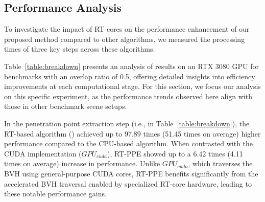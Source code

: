 
%


\subsection{Performance Analysis}

To investigate the impact of RT cores on the performance enhancement of our proposed method compared to other algorithms, we measured the processing times of three key steps across these algorithms. 

Table~\ref{table:breakdown} presents an analysis of results on an RTX 3080 GPU for benchmarks with an overlap ratio of 0.5, offering detailed insights into efficiency improvements at each computational stage.  
For this section, we focus our analysis on this specific experiment, as the performance trends observed here align with those in other benchmark scene setups.


In the penetration point extraction step (i.e.,  in Table~\ref{table:breakdown}), the RT-based algorithm () achieved up to 97.89 times (51.45 times on average) higher performance compared to the CPU-based algorithm.
When contrasted with the CUDA implementation ($GPU_{cuda}$), RT-PPE showed up to a 6.42 times (4.11 times on average) increase in performance.
Unlike $GPU_{cuda}$, which traverses the BVH using general-purpose CUDA cores, RT-PPE benefits significantly from the accelerated BVH traversal enabled by specialized RT-core hardware, leading to these notable performance gains.

